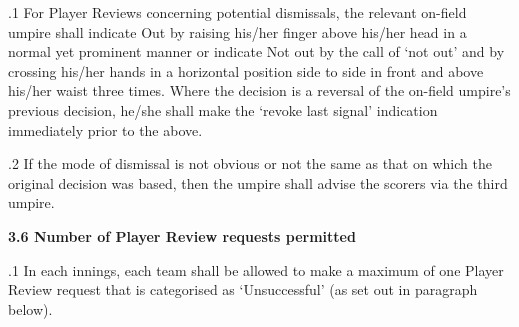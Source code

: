 \documentclass[12pt]{article}
\begin{document}
\vspace{\baselineskip}
\begin{adjustwidth}{0.5in}{0.08in}
{\fontsize{9pt}{10.8pt}.1 \tabto{0.49in} For Player Reviews concerning potential dismissals, the relevant on-field umpire shall indicate Out by raising his/her finger above his/her head in a normal yet prominent manner or indicate Not out by the call of ‘not out’ and by crossing his/her hands in a horizontal position side to side in front and above his/her waist three times. Where the decision is a reversal of the on-field umpire’s previous decision, he/she shall make the ‘revoke last signal’ indication immediately prior to the above.\par}\par

\end{adjustwidth}


\vspace{\baselineskip}
\begin{adjustwidth}{0.5in}{0.32in}
{\fontsize{9pt}{10.8pt}.2 \tabto{0.49in} If the mode of dismissal is not obvious or not the same as that on which the original decision was based, then the umpire shall advise the scorers via the third umpire.\par}\par

\end{adjustwidth}


\vspace{\baselineskip}
{\fontsize{11pt}{13.2pt}\selectfont \textbf{3.6 \tabto{0.47in} Number of Player Review requests permitted}\par}\par


\vspace{\baselineskip}
\begin{adjustwidth}{0.5in}{0.47in}
{\fontsize{9pt}{10.8pt}.1 \tabto{0.49in} In each innings, each team shall be allowed to make a maximum of one Player Review request that is categorised as ‘Unsuccessful’ (as set out in paragraph below).\par}\par

\end{adjustwidth}


\vspace{\baselineskip}

\vspace{\baselineskip}
\end{document}
